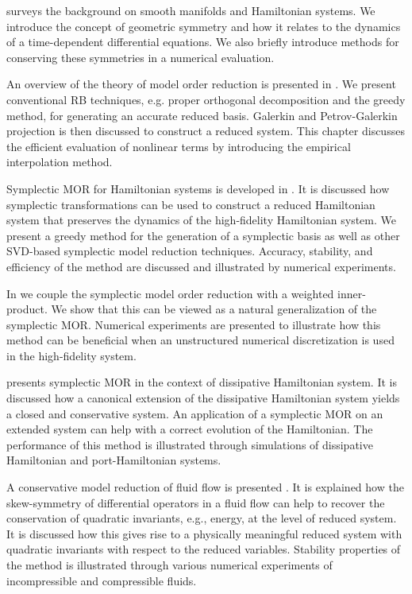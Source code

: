 surveys the background on smooth manifolds and Hamiltonian systems. We introduce the concept of geometric symmetry and how it relates to the dynamics of a time-dependent differential equations. We also briefly introduce methods for conserving these symmetries in a numerical evaluation.

An overview of the theory of model order reduction is presented in . We present conventional RB techniques, e.g. proper orthogonal decomposition and the greedy method, for generating an accurate reduced basis. Galerkin and Petrov-Galerkin projection is then discussed to construct a reduced system. This chapter discusses the efficient evaluation of nonlinear terms by introducing the empirical interpolation method.

Symplectic MOR for Hamiltonian systems is developed in . It is discussed how symplectic transformations can be used to construct a reduced Hamiltonian system that preserves the dynamics of the high-fidelity Hamiltonian system. We present a greedy method for the generation of a symplectic basis as well as other SVD-based symplectic model reduction techniques. Accuracy, stability, and efficiency of the method are discussed and illustrated by numerical experiments.

In  we couple the symplectic model order reduction with a weighted inner-product. We show that this can be viewed as a natural generalization of the symplectic MOR. Numerical experiments are presented to illustrate how this method can be beneficial when an unstructured numerical discretization is used in the high-fidelity system.

 presents symplectic MOR in the context of dissipative Hamiltonian system. It is discussed how a canonical extension of the dissipative Hamiltonian system yields a closed and conservative system. An application of a symplectic MOR on an extended system can help with a correct evolution of the Hamiltonian. The performance of this method is illustrated through simulations of dissipative Hamiltonian and port-Hamiltonian systems.

A conservative model reduction of fluid flow is presented . It is explained how the skew-symmetry of differential operators in a fluid flow can help to recover the conservation of quadratic invariants, e.g., energy, at the level of reduced system. It is discussed how this gives rise to a physically meaningful reduced system with quadratic invariants with respect to the reduced variables. Stability properties of the method is illustrated through various numerical experiments of incompressible and compressible fluids.
